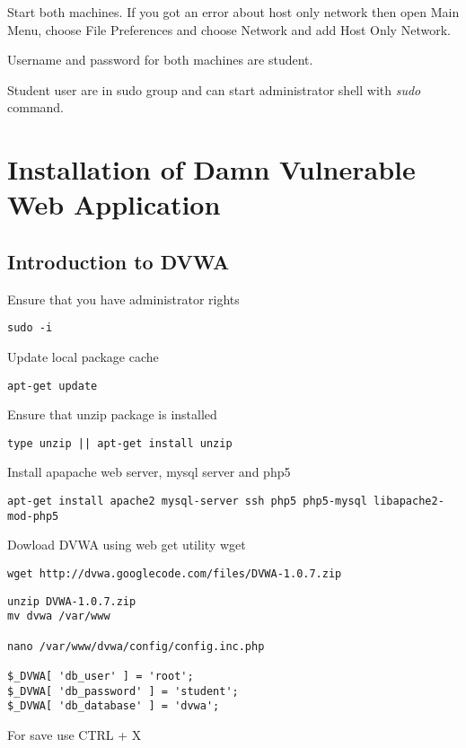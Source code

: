 Start both machines. 
{\small{If you got an error about host only network then open Main Menu, choose File Preferences and choose Network and add Host Only Network.}}

Username and password for both machines are student.

Student user are in sudo group and can start administrator shell with \emph{sudo} command.

\section{Installation of Damn Vulnerable Web Application}
\subsection{Introduction to DVWA}

Ensure that you have administrator rights
\begin{verbatim}
sudo -i
\end{verbatim}

Update local package cache
\begin{verbatim}
apt-get update
\end{verbatim}


Ensure that unzip package is installed
\begin{verbatim}
type unzip || apt-get install unzip
\end{verbatim}

Install apapache web server, mysql server and php5
\begin{verbatim}
apt-get install apache2 mysql-server ssh php5 php5-mysql libapache2-mod-php5
\end{verbatim}


Dowload DVWA using web get utility wget
\begin{verbatim}
wget http://dvwa.googlecode.com/files/DVWA-1.0.7.zip
\end{verbatim}

\begin{verbatim}
unzip DVWA-1.0.7.zip
mv dvwa /var/www

nano /var/www/dvwa/config/config.inc.php

$_DVWA[ 'db_user' ] = 'root';
$_DVWA[ 'db_password' ] = 'student';
$_DVWA[ 'db_database' ] = 'dvwa';
\end{verbatim}
For save use  CTRL + X

